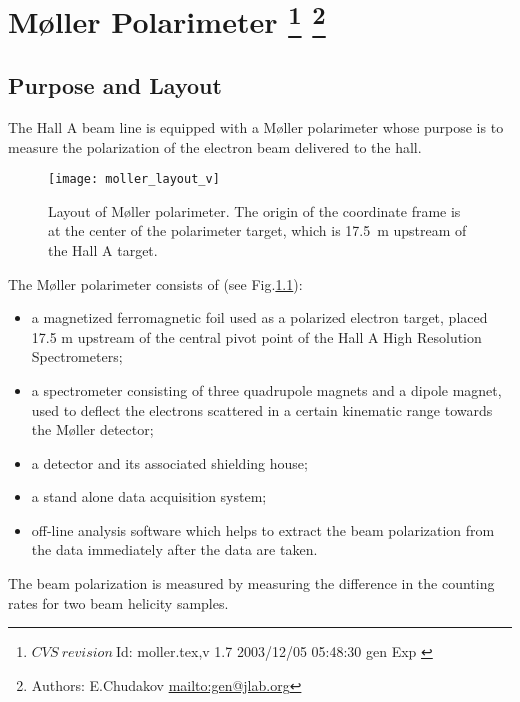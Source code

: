 \chapter[M{\o}ller Polarimeter]{M{\o}ller Polarimeter
\footnote{
  $CVS~revision~ $Id: moller.tex,v 1.7 2003/12/05 05:48:30 gen Exp $ $
}
\footnote{Authors: E.Chudakov \url{mailto:gen@jlab.org}}
}
\label{sec:moller}
\section {Purpose and Layout}
\label{sec:moller_purpose}

The Hall A beam line is equipped with a M{\o}ller 
polarimeter
whose purpose is 
to measure the polarization of the electron beam delivered to the hall. 

 \begin{figure}[bht]
    \begin{center}
        \texttt{[image: moller\_layout\_v]}
    \end{center}
    \caption[M{\o}ller: layout]{
            Layout of M{\o}ller polarimeter. The origin of the 
            coordinate frame is at the center of the polarimeter
             target, which is 17.5~m upstream of the Hall A target.
            }
    \label{fig:moller_layout} 
 \end{figure}  

The M{\o}ller polarimeter consists of (see Fig.\ref{fig:moller_layout}):
\begin{itemize}
\item  a magnetized ferromagnetic foil used as a polarized electron target,
       placed 17.5 m upstream of the central 
       pivot point of the Hall A High Resolution Spectrometers;

\item a spectrometer consisting of three quadrupole magnets and a dipole magnet,
      used to deflect the electrons scattered in a certain kinematic
      range towards the M{\o}ller detector;

\item a detector and its associated shielding house;
\item a stand alone data acquisition system;
\item off-line analysis software which helps to extract the beam polarization
      from the data immediately after the data are taken. 
\end{itemize}

The beam polarization is measured by measuring the difference
in the counting rates for two beam helicity samples.  

